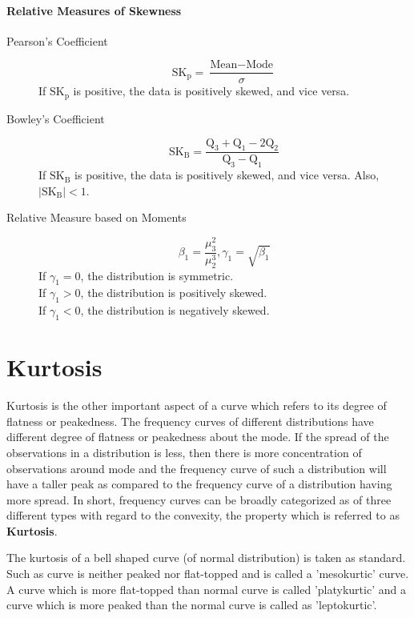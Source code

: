 \documentclass[
10pt, %
a4paper, %
]{report}
\begin{document}
\paragraph*{Relative Measures of Skewness}
\begin{description}
\item[Pearson's Coefficient]
\[\text{SK}_\text{p} = \frac{\text{Mean} - \text{Mode}}{\sigma} \]
If \(\text{SK}_\text{p}\) is positive, the data is positively skewed, and vice versa.
\item[Bowley's Coefficient]
\[\text{SK}_\text{B} = \frac{\mathrm{Q}_3+\mathrm{Q}_1 - 2\mathrm{Q}_2}{\mathrm{Q}_3 - \mathrm{Q}_1} \]
If \(\text{SK}_\text{B}\) is positive, the data is positively skewed, and vice versa. Also, \(|\text{SK}_\text{B}|<1\).
\item[Relative Measure based on Moments]
\[\beta_1 = \dfrac{\mu_3^2}{\mu_2^3}, \gamma_1 = \sqrt{\beta_1} \]
If \(\gamma_1 = 0\), the distribution is symmetric. \\
If \(\gamma_1 > 0\), the distribution is positively skewed.\\
If \(\gamma_1 < 0\), the distribution is negatively skewed.\\
\end{description}

\section{Kurtosis}

Kurtosis is the other important aspect of a curve which refers to its degree of flatness or peakedness. The frequency curves of different distributions have different degree of flatness or peakedness about the mode. If the spread of the observations in a distribution is less, then there is more concentration of observations around mode and the frequency curve of such a distribution will have a taller peak as compared to the frequency curve of a distribution having more spread. In short, frequency curves can be broadly categorized as of three different types with regard to the convexity, the property which is referred to as \textbf{Kurtosis}.

The kurtosis of a bell shaped curve (of normal distribution) is taken as standard. Such as curve is neither peaked nor flat-topped and is called a 'mesokurtic' curve. A curve which is more flat-topped than normal curve is called 'platykurtic' and a curve which is more peaked than the normal curve is called as 'leptokurtic'.
\end{document}
